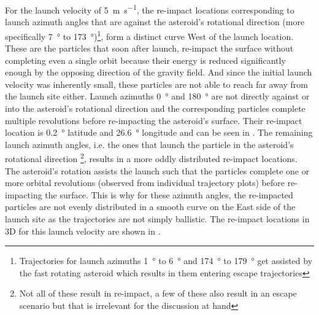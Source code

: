 For the launch velocity of \SI{5}{\metre \per \second}, the re-impact locations corresponding to launch azimuth angles that are against the asteroid's rotational direction (more specifically \SI{7}{\degree} to \SI{173}{\degree})\footnote{Trajectories for launch azimuths \SI{1}{\degree} to \SI{6}{\degree} and \SI{174}{\degree} to \SI{179}{\degree} get assisted by the fast rotating asteroid which results in them entering escape trajectories}, form a distinct curve West of the launch location. These are the particles that soon after launch, re-impact the surface without completing even a single orbit because their energy is reduced significantly enough by the opposing direction of the gravity field. And since the initial launch velocity was inherently small, these particles are not able to reach far away from the launch site either. Launch azimuths \SI{0}{\degree} and \SI{180}{\degree} are not directly against or into the asteroid's rotational direction and the corresponding particles complete multiple revolutions before re-impacting the asteroid's surface. Their re-impact location is \SI{0.2}{\degree} latitude and \SI{26.6}{\degree} longitude and can be seen in . The remaining launch azimuth angles, i.e. the ones that launch the particle in the asteroid's rotational direction \footnote{Not all of these result in re-impact, a few of these also result in an escape scenario but that is irrelevant for the discussion at hand}, results in a more oddly distributed re-impact locations. The asteroid's rotation assists the launch such that the particles complete one or more orbital revolutions (observed from individual trajectory plots) before re-impacting the surface. This is why for these azimuth angles, the re-impacted particles are not evenly distributed in a smooth curve on the East side of the launch site as the trajectories are not simply ballistic. The re-impact locations in 3D for this launch velocity are shown in .
